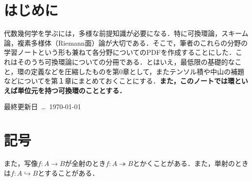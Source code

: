 \documentclass[autodetect-engine,dvi=dvipdfmx,ja=standard,japaram={units}]{bxjsarticle} %
\begin{document}
	\nocite{*}
	\newpage
	\part*{はじめに}
	代数幾何学を学ぶには，多様な前提知識が必要になる．特に可換環論，スキーム論，複素多様体（Riemann面）論が大切である．そこで，筆者のこれらの分野の学習ノートという形も兼ねて各分野についてのPDFを作成することにした．これはそのうち可換環論についての分冊である．とはいえ，最低限の基礎的なこと，環の定義などを圧縮したものを第0章として，またテンソル積や中山の補題などについてを第１章にまとめておくことにする．\textbf{また，このノートでは環といえば単位元を持つ可換環のこととする．}
	
	\hspace*{\fill}最終更新日~\dots~\today
	
	\part*{記号}
	
	
	また，写像$f:A\to B$が全射のとき$f:A\twoheadrightarrow B$とかくことがある．また，単射のときは$f:A\hookrightarrow B$とすることがある．
	\newpage
	
	\tableofcontents
	
	
	\def\prepartname{付録}
	\def\postpartname{}
	\thepartchange
%	 
	
	
	\printindex
	
	\newpage
	
	
\end{document}
